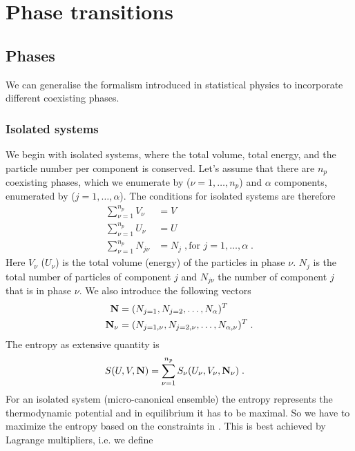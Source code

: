 \chapter{Phase transitions}
\newcommand{\Nphases}{n_{p}}
\section{Phases}
We can generalise  the formalism introduced in statistical physics to incorporate different coexisting phases.

\subsection{Isolated systems}

We begin with isolated systems, where the total volume, total  energy, and the particle number per component is conserved. Let's assume that there are $\Nphases $ coexisting phases, which we enumerate by
($\nu=1,\ldots,\Nphases $) and $\alpha$ components, enumerated by ($j=1,\ldots,\alpha$).
The conditions for isolated systems are therefore
\begin{subequations}\label{eq:constraints}
\begin{align}
\sum_{\nu=1}^{\Nphases } V_{\nu} &= V\\
\sum_{\nu=1}^{\Nphases } U_{\nu} &= U\\
\sum_{\nu=1}^{\Nphases } N_{j\nu} &= N_{j}\;,\text{for } j=1,\ldots, \alpha\;.
\label{eq:constraints:c}
\end{align}
\end{subequations}
Here $V_{\nu}$ ($U_{\nu}$) is the total volume (energy) of the  particles in phase $\nu$.
$N_{j}$ is the total number of particles of component $j$ and $N_{j\nu}$ the number of component
$j$ that is in phase $\nu$. We also introduce the following vectors
%
\begin{align}\label{def:N}
\mathbf N &= (N_{j=1},N_{j=2},\ldots,N_{\alpha})^{T}\\
\mathbf N_{\nu} &= (N_{j=1,\nu},N_{j=2,\nu},\ldots,N_{\alpha,\nu})^{T}\;.
\end{align}
%
The entropy as extensive quantity is 
%
\begin{align}\label{eq:}
S(U,V,\vv N) &= \sum_{\nu=1}^{\Nphases } S_{\nu}(U_{\nu},V_{\nu},\vv N_{\nu})\;.
\end{align}
%
For an isolated system (micro-canonical ensemble) the entropy represents the thermodynamic
potential and in equilibrium it has to be maximal. So we have to maximize the entropy based on
the constraints in . This is best achieved by Lagrange multipliers, i.e. we define
